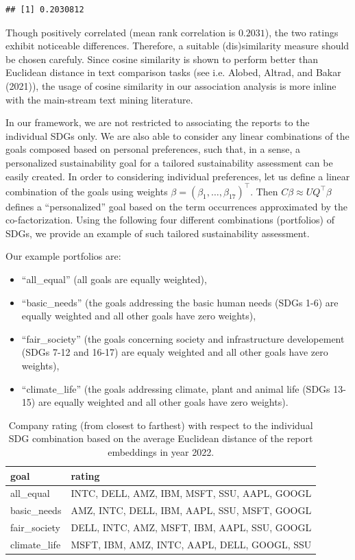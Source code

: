 \documentclass[
]{article}
\providecommand{\tightlist}{%
  \setlength{\itemsep}{0pt}\setlength{\parskip}{0pt}}
\begin{document}
\begin{verbatim}
## [1] 0.2030812
\end{verbatim}

Though positively correlated (mean rank correlation is \(0.2031\)), the two ratings exhibit noticeable differences. Therefore, a suitable (dis)similarity measure should be chosen carefuly. Since cosine similarity is shown to perform better than Euclidean distance in text comparison tasks (see i.e. Alobed, Altrad, and Bakar (2021)), the usage of cosine similarity in our association analysis is more inline with the main-stream text mining literature.

In our framework, we are not restricted to associating the reports to the individual SDGs only. We are also able to consider any linear combinations of the goals composed based on personal preferences, such that, in a sense, a personalized sustainability goal for a tailored sustainability assessment can be easily created. In order to considering individual preferences, let us define a linear combination of the goals using weights \(\beta=(\beta_1,\ldots,\beta_{17})^\top\). Then \(C\beta\approx UQ^\top\beta\) defines a ``personalized'' goal based on the term occurrences approximated by the co-factorization. Using the following four different combinations (portfolios) of SDGs, we provide an example of such tailored sustainability assessment.

Our example portfolios are:

\begin{itemize}
\tightlist
\item
  ``all\_equal'' (all goals are equally weighted),
\item
  ``basic\_needs'' (the goals addressing the basic human needs (SDGs 1-6) are equally weighted and all other goals have zero weights),
\item
  ``fair\_society'' (the goals concerning society and infrastructure developement (SDGs 7-12 and 16-17) are equaly weighted and all other goals have zero weights),
\item
  ``climate\_life'' (the goals addressing climate, plant and animal life (SDGs 13-15) are equally weighted and all other goals have zero weights).
\end{itemize}

\begin{table}

\caption{\label{tab:tab03}Company rating (from closest to farthest) with respect to the individual SDG combination based on the average Euclidean distance of the report embeddings in year 2022.}
\centering
\begin{tabular}[t]{l|l}
\hline
goal & rating\\
\hline
all\_equal & INTC, DELL, AMZ, IBM, MSFT, SSU, AAPL, GOOGL\\
\hline
basic\_needs & AMZ, INTC, DELL, IBM, AAPL, SSU, MSFT, GOOGL\\
\hline
fair\_society & DELL, INTC, AMZ, MSFT, IBM, AAPL, SSU, GOOGL\\
\hline
climate\_life & MSFT, IBM, AMZ, INTC, AAPL, DELL, GOOGL, SSU\\
\hline
\end{tabular}
\end{table}
\end{document}
